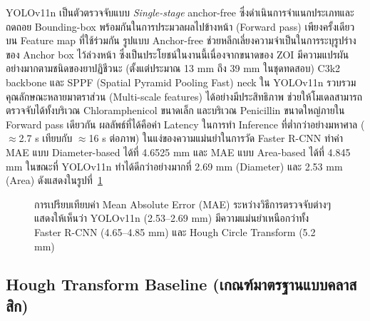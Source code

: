 YOLOv11n \cite{wang2024yolov11} เป็นตัวตรวจจับแบบ \emph{Single-stage} anchor-free
ซึ่งดำเนินการจำแนกประเภทและถดถอย Bounding-box พร้อมกันในการประมวลผลไปข้างหน้า (Forward pass) เพียงครั้งเดียวบน Feature map ที่ใช้ร่วมกัน
รูปแบบ Anchor-free ช่วยหลีกเลี่ยงความจำเป็นในการระบุรูปร่างของ Anchor box ไว้ล่วงหน้า ซึ่งเป็นประโยชน์ในงานนี้เนื่องจากขนาดของ ZOI มีความแปรผันอย่างมากตามชนิดของยาปฏิชีวนะ (ตั้งแต่ประมาณ 13 mm ถึง 39 mm ในชุดทดสอบ)
C3k2 backbone และ SPPF (Spatial Pyramid Pooling Fast) neck ใน YOLOv11n
รวบรวมคุณลักษณะหลายมาตราส่วน (Multi-scale features) ได้อย่างมีประสิทธิภาพ
ช่วยให้โมเดลสามารถตรวจจับได้ทั้งบริเวณ Chloramphenicol ขนาดเล็ก และบริเวณ Penicillin ขนาดใหญ่ภายใน Forward pass เดียวกัน
ผลลัพธ์ที่ได้คือค่า Latency ในการทำ Inference ที่ต่ำกว่าอย่างมหาศาล ($\approx$2.7 s เทียบกับ $\approx$16 s ต่อภาพ)
ในแง่ของความแม่นยำในการวัด Faster R-CNN ทำค่า MAE แบบ Diameter-based ได้ที่ 4.6525 mm
และ MAE แบบ Area-based ได้ที่ 4.845 mm ในขณะที่ YOLOv11n ทำได้ดีกว่าอย่างมากที่ 2.69 mm (Diameter) และ 2.53 mm (Area) ดังแสดงในรูปที่~\ref{fig:mae_bar}

\begin{figure}[H]
  \centering
  \caption{การเปรียบเทียบค่า Mean Absolute Error (MAE) ระหว่างวิธีการตรวจจับต่างๆ
           แสดงให้เห็นว่า YOLOv11n (2.53--2.69 mm) มีความแม่นยำเหนือกว่าทั้ง Faster R-CNN (4.65--4.85 mm)
           และ Hough Circle Transform (5.2 mm)}
  \label{fig:mae_bar}
\end{figure}

\subsection{Hough Transform Baseline (เกณฑ์มาตรฐานแบบคลาสสิก)}

